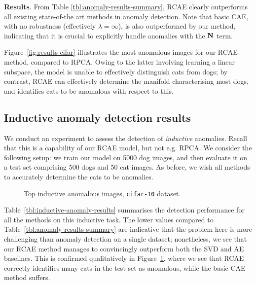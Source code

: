 \textbf{Results}.
From Table \ref{tbl:anomaly-results-summary},
RCAE clearly outperforms all existing state-of-the art methods in anomaly detection.
Note that basic CAE, with no robustness (effectively $\lambda = \infty$), is also outperformed by our method, indicating that it is crucial to explicitly handle anomalies with the $\mathbf{N}$ term.

Figure~\ref{fig:results-cifar} illustrates the most anomalous images for our RCAE method, compared to RPCA.
Owing to the latter involving learning a linear subspace, the model is unable to effectively distinguish cats from dogs;
by contrast, RCAE can effectively determine the manifold characterising most dogs, and identifies cats to be anomalous with respect to this.


\subsection{Inductive anomaly detection results}

We conduct an experiment to assess the detection of \emph{inductive} anomalies.
Recall that this is a capability of our RCAE model, but not e.g. RPCA.
We consider the following setup:
we train our model on 5000 dog images, and then evaluate it on a test set comprising 500 dogs and 50 cat images.
As before, we wish all methods to accurately determine the cats to be anomalies.

\begin{figure}[!t]
	\centering
	\caption{Top inductive anomalous images, {\tt cifar-10} dataset.}
	\label{fig:results-cifar-inductive}
\end{figure}


Table~\ref{tbl:inductive-anomaly-results} summarises the detection performance for all the methods on this inductive task.
The lower values compared to Table~\ref{tbl:anomaly-results-summary} are indicative that the problem here is more challenging than anomaly detection on a single dataset;
nonetheless, we see that our RCAE method manages to convincingly outperform both the SVD and AE baselines.
This is confirmed qualitatively in Figure~\ref{fig:results-cifar-inductive}, where we see that RCAE correctly identifies many cats in the test set as anomalous, while the basic
CAE
method suffers.

